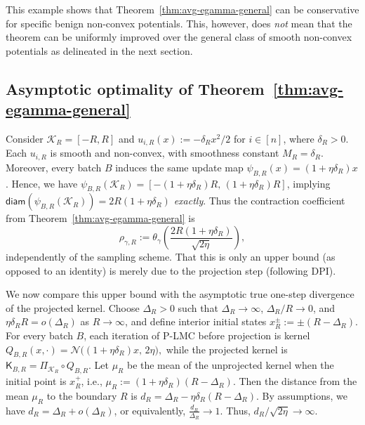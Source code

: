 \documentclass[10pt, journal]{IEEEtran}
\newcommand{\sK}{\mathsf{K}}
\begin{document}
This example shows that Theorem~\ref{thm:avg-egamma-general} can be conservative for specific benign non-convex potentials. This, however, does \emph{not} mean that the theorem can be uniformly improved over the general class of smooth non-convex potentials as delineated in the next section.


\subsection{Asymptotic optimality of Theorem~\ref{thm:avg-egamma-general}}\label{app:optimalityofTheta}
Consider $\mathcal K_R=[-R,R]$ and $u_{i,R}(x):=-\delta_Rx^2/2$ for $i\in[n]$, where $\delta_R>0$. Each $u_{i,R}$ is smooth and non-convex, with smoothness constant $M_R=\delta_R$. Moreover, every batch $B$ induces the same update map $\psi_{B,R}(x)=(1+\eta\delta_R)x$. Hence, we have $\psi_{B,R}(\mathcal K_R)=[-(1+\eta\delta_R)R,\,(1+\eta\delta_R)R]$, implying $\mathsf{diam}(\psi_{B,R}(\mathcal K_R))=2R(1+\eta\delta_R)$ \textit{exactly}. 
Thus the contraction coefficient from Theorem~\ref{thm:avg-egamma-general} is
$$\rho_{\gamma,R}:=\theta_\gamma\left(\frac{2R(1+\eta\delta_R)}{\sqrt{2\eta}}\right),$$
independently of the sampling scheme. That this is only an upper bound (as opposed to an identity) is merely due to the projection step (following DPI). 

We now compare this upper bound with the asymptotic true one-step divergence of the projected kernel. Choose $\Delta_R>0$ such that $\Delta_R\to\infty$, $\Delta_R/R\to 0$, and $\eta\delta_R R=o(\Delta_R)$ as $R\to \infty$, and define interior initial states $x_R^\pm:=\pm(R-\Delta_R)$. For every batch $B$, each iteration of P-LMC before projection is kernel
$Q_{B,R}(x,\cdot)=\mathcal N\!\bigl((1+\eta\delta_R)x,\,2\eta\bigr),$ while the projected kernel is $\sK_{B,R}=\Pi_{\mathcal K_R}\circ Q_{B,R}$. Let $\mu_R$ be the mean of the unprojected kernel when the initial point is $x_R^+$, i.e., $\mu_R:=(1+\eta\delta_R)(R-\Delta_R).$ Then the distance from the mean $\mu_R$ to the boundary $R$ is $d_R=\Delta_R-\eta\delta_R(R-\Delta_R).$
By assumptions, we have $d_R = \Delta_R + o(\Delta_R)$, or equivalently, $\frac{d_R}{\Delta_R} \to 1$. Thus, $d_R/\sqrt{2\eta}\to\infty$. 
\end{document}
